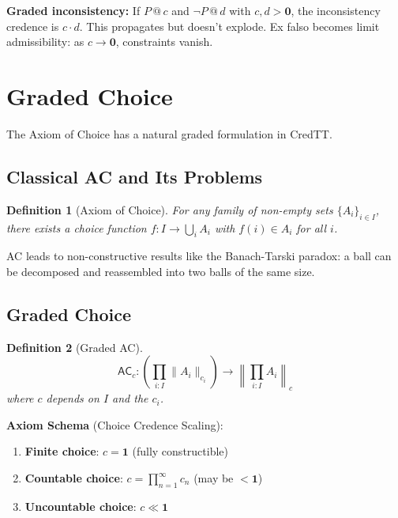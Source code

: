 \documentclass[11pt,a4paper]{article}
\makeatletter
\newtheorem{definition}{Definition}[section]
\newcommand{\at}[1]{\,@\,#1}
\newcommand{\one}{\mathbf{1}}
\newcommand{\zero}{\mathbf{0}}
\newcommand{\negc}{\neg}
\makeatother
\begin{document}
\textbf{Graded inconsistency:} If $P \at{c}$ and $\negc P \at{d}$ with $c,d > \zero$, the inconsistency credence is $c \cdot d$. This propagates but doesn't explode. Ex falso becomes limit admissibility: as $c \to \zero$, constraints vanish.

\section{Graded Choice}

The Axiom of Choice has a natural graded formulation in CredTT.

\subsection{Classical AC and Its Problems}

\begin{definition}[Axiom of Choice]
For any family of non-empty sets $\{A_i\}_{i \in I}$, there exists a choice function $f : I \to \bigcup_i A_i$ with $f(i) \in A_i$ for all $i$.
\end{definition}

AC leads to non-constructive results like the Banach-Tarski paradox: a ball can be decomposed and reassembled into two balls of the same size.

\subsection{Graded Choice}

\begin{definition}[Graded AC]
\[
\mathsf{AC}_c : \left(\prod_{i:I} \|A_i\|_{c_i}\right) \to \left\|\prod_{i:I} A_i\right\|_c
\]
where $c$ depends on $I$ and the $c_i$.
\end{definition}

\textbf{Axiom Schema} (Choice Credence Scaling):
\begin{enumerate}
    \item \textbf{Finite choice}: $c = \one$ (fully constructible)
    \item \textbf{Countable choice}: $c = \prod_{n=1}^\infty c_n$ (may be $< \one$)
    \item \textbf{Uncountable choice}: $c \ll \one$
\end{enumerate}
\end{document}
